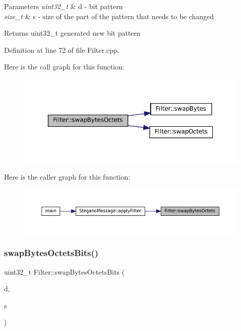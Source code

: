 \begin{DoxyParams}{Parameters}
{\em uint32\+\_\+t} & d -\/ bit pattern \\
\hline
{\em size\+\_\+t} & s -\/ size of the part of the pattern that needs to be changed \\
\hline
\end{DoxyParams}
\begin{DoxyReturn}{Returns}
uint32\+\_\+t generated new bit pattern 
\end{DoxyReturn}


Definition at line 72 of file Filter.\+cpp.

Here is the call graph for this function\+:\nopagebreak
\begin{figure}[H]
\begin{center}
\leavevmode
\includegraphics[width=350pt]{classFilter_a55c046859fbbb468536cae5c1f95c702_cgraph}
\end{center}
\end{figure}
Here is the caller graph for this function\+:
\nopagebreak
\begin{figure}[H]
\begin{center}
\leavevmode
\includegraphics[width=350pt]{classFilter_a55c046859fbbb468536cae5c1f95c702_icgraph}
\end{center}
\end{figure}
\mbox{\label{classFilter_a9c8e2eb790e7e9dff6493a12a1fefc4f}} 
\subsubsection{\texorpdfstring{swapBytesOctetsBits()}{swapBytesOctetsBits()}}
{\footnotesize\ttfamily uint32\+\_\+t Filter\+::swap\+Bytes\+Octets\+Bits (\begin{DoxyParamCaption}\item[{uint32\+\_\+t}]{d,  }\item[{size\+\_\+t}]{s }\end{DoxyParamCaption})\hspace{0.3cm}{\ttfamily [static]}}



